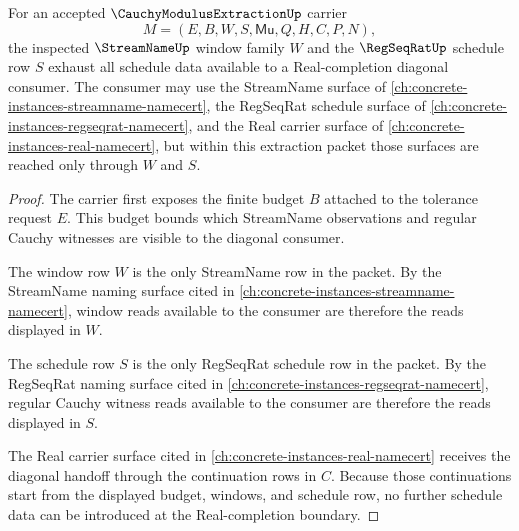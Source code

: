 \begin{theorem}
\label{thm:cauchy-modulus-extraction-window-schedule-exhaustion}
For an accepted $\CauchyModulusExtractionUp$ carrier
$$
M=(E,B,W,S,\mathsf{Mu},Q,H,C,P,N),
$$
the inspected $\StreamNameUp$ window family $W$ and the $\RegSeqRatUp$ schedule row $S$ exhaust all schedule data available to a Real-completion diagonal consumer. The consumer may use the StreamName surface of \autoref{ch:concrete-instances-streamname-namecert}, the RegSeqRat schedule surface of \autoref{ch:concrete-instances-regseqrat-namecert}, and the Real carrier surface of \autoref{ch:concrete-instances-real-namecert}, but within this extraction packet those surfaces are reached only through $W$ and $S$.
\end{theorem}
\begin{proof}
The carrier first exposes the finite budget $B$ attached to the tolerance request $E$. This budget bounds which StreamName observations and regular Cauchy witnesses are visible to the diagonal consumer.

The window row $W$ is the only StreamName row in the packet. By the StreamName naming surface cited in \autoref{ch:concrete-instances-streamname-namecert}, window reads available to the consumer are therefore the reads displayed in $W$.

The schedule row $S$ is the only RegSeqRat schedule row in the packet. By the RegSeqRat naming surface cited in \autoref{ch:concrete-instances-regseqrat-namecert}, regular Cauchy witness reads available to the consumer are therefore the reads displayed in $S$.

The Real carrier surface cited in \autoref{ch:concrete-instances-real-namecert} receives the diagonal handoff through the continuation rows in $C$. Because those continuations start from the displayed budget, windows, and schedule row, no further schedule data can be introduced at the Real-completion boundary.
\end{proof}

